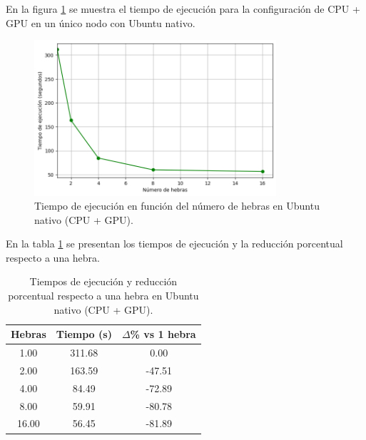 En la figura \ref{fig:single-node_ubuntu__gpu_native_time} se muestra el tiempo de ejecución para la configuración de CPU + GPU en un único nodo con Ubuntu nativo.

\begin{figure}[H]
    \centering
    \includegraphics[width=0.8\textwidth]{imagenes/cap5/single-node_ubuntu_gpu_native_time.png}
    \caption{Tiempo de ejecución en función del número de hebras en Ubuntu nativo (CPU + GPU).}
    \label{fig:single-node_ubuntu__gpu_native_time}
\end{figure}

En la tabla \ref{tab:single-node_ubuntu_gpu_native} se presentan los tiempos de ejecución y la reducción porcentual respecto a una hebra.

\begin{table}[ht]
    \centering
    \begin{tabular}{|c|c|c|}
        \hline
        \textbf{Hebras} & \textbf{Tiempo (s)} & \textbf{$\Delta$\% vs 1 hebra} \\
        \hline
        1.00            & 311.68              & 0.00                           \\
        2.00            & 163.59              & -47.51                         \\
        4.00            & 84.49               & -72.89                         \\
        8.00            & 59.91               & -80.78                         \\
        16.00           & 56.45               & -81.89                         \\
        \hline
    \end{tabular}
    \caption{Tiempos de ejecución y reducción porcentual respecto a una hebra en Ubuntu nativo (CPU + GPU).}
    \label{tab:single-node_ubuntu_gpu_native}
\end{table}

